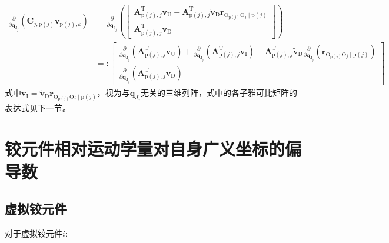 \[
\begin{aligned}
\frac{\partial}{\partial \boldsymbol{q}_{\mathrm{J}_{j}}}\left(\boldsymbol{C}_{j, \mathrm{p}(j)} \boldsymbol{v}_{\mathrm{p}(j), k}\right) & =\frac{\partial}{\partial \boldsymbol{q}_{\mathrm{J}_{j}}}\left(\left[\begin{array}{c}
\boldsymbol{A}_{\mathrm{p}(j), j}^{\mathrm{T}} \boldsymbol{v}_{\mathrm{U}}+\boldsymbol{A}_{\mathrm{p}(j), j}^{\mathrm{T}} \tilde{\boldsymbol{v}}_{\mathrm{D}} \boldsymbol{r}_{\mathrm{O}_{\mathrm{p}(j)} \mathrm{O}_{j} \mid \mathrm{p}(j)} \\
\boldsymbol{A}_{\mathrm{p}(j), j}^{\mathrm{T}} \boldsymbol{v}_{\mathrm{D}}
\end{array}\right]\right) \\
& =:\left[\begin{array}{c}
\frac{\partial}{\partial \boldsymbol{q}_{\mathrm{J}_{j}}}\left(\boldsymbol{A}_{\mathrm{p}(j), j}^{\mathrm{T}} \boldsymbol{v}_{\mathrm{U}}\right)+\frac{\partial}{\partial \boldsymbol{q}_{\mathrm{J}_{j}}}\left(\boldsymbol{A}_{\mathrm{p}(j), j}^{\mathrm{T}} \boldsymbol{v}_{\mathrm{I}}\right)+\boldsymbol{A}_{\mathrm{p}(j), j}^{\mathrm{T}} \tilde{\boldsymbol{v}}_{\mathrm{D}} \frac{\partial}{\partial \boldsymbol{q}_{\mathrm{J}_{j}}}\left(\boldsymbol{r}_{\mathrm{O}_{\mathrm{p}(j)} \mathrm{O}_{j} \mid \mathrm{p}(j)}\right) \\
\frac{\partial}{\partial \boldsymbol{q}_{\mathrm{J}_{j}}}\left(\boldsymbol{A}_{\mathrm{p}(j), j}^{\mathrm{T}} \boldsymbol{v}_{\mathrm{D}}\right)
\end{array}\right]
\end{aligned}
\]
式中$\boldsymbol{v}_{\mathrm{I}}=\tilde{\boldsymbol{v}}_{\mathrm{D}} \boldsymbol{r}_{\mathrm{O}_{\mathrm{p}(j)} \mathrm{O}_{j} \mid \mathrm{p}(j)}$，视为与$\boldsymbol{q}_{J_{j}}$无关的三维列阵，式中的各子雅可比矩阵的表达式见下一节。
\section{铰元件相对运动学量对自身广义坐标的偏导数}
\subsection{虚拟铰元件}
对于虚拟铰元件$i$:

